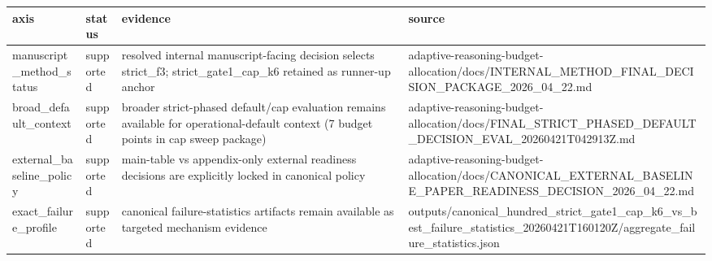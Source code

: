 \begin{tabular}{llll}
\hline
axis & status & evidence & source \\
\hline
manuscript\_method\_status & supported & resolved internal manuscript-facing decision selects strict\_f3; strict\_gate1\_cap\_k6 retained as runner-up anchor & adaptive-reasoning-budget-allocation/docs/INTERNAL\_METHOD\_FINAL\_DECISION\_PACKAGE\_2026\_04\_22.md \\
broad\_default\_context & supported & broader strict-phased default/cap evaluation remains available for operational-default context (7 budget points in cap sweep package) & adaptive-reasoning-budget-allocation/docs/FINAL\_STRICT\_PHASED\_DEFAULT\_DECISION\_EVAL\_20260421T042913Z.md \\
external\_baseline\_policy & supported & main-table vs appendix-only external readiness decisions are explicitly locked in canonical policy & adaptive-reasoning-budget-allocation/docs/CANONICAL\_EXTERNAL\_BASELINE\_PAPER\_READINESS\_DECISION\_2026\_04\_22.md \\
exact\_failure\_profile & supported & canonical failure-statistics artifacts remain available as targeted mechanism evidence & outputs/canonical\_hundred\_strict\_gate1\_cap\_k6\_vs\_best\_failure\_statistics\_20260421T160120Z/aggregate\_failure\_statistics.json \\
\hline
\end{tabular}
